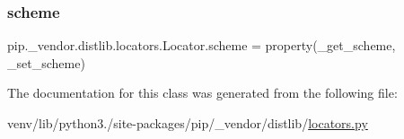 \subsubsection{\texorpdfstring{scheme}{scheme}}
{\footnotesize\ttfamily pip.\+\_\+vendor.\+distlib.\+locators.\+Locator.\+scheme = property(\+\_\+get\+\_\+scheme, \+\_\+set\+\_\+scheme)\hspace{0.3cm}{\ttfamily [static]}}



The documentation for this class was generated from the following file\+:\begin{DoxyCompactItemize}
\item 
venv/lib/python3./site-\/packages/pip/\+\_\+vendor/distlib/\hyperlink{locators_8py}{locators.\+py}\end{DoxyCompactItemize}
